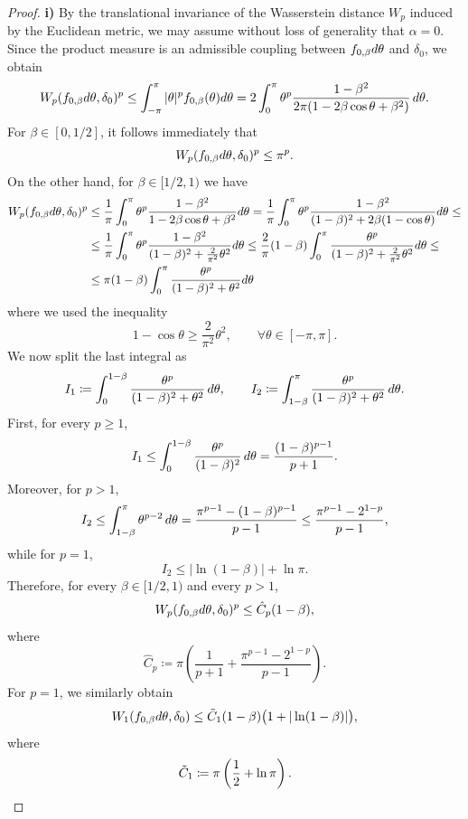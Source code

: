 \documentclass[10pt,a4paper]{amsart}
\renewcommand{\d}{\textnormal{d}}
\begin{document}
    \begin{proof} \textbf{i)} By the translational invariance of the Wasserstein distance $W_p$ induced by the Euclidean metric, we may assume without loss of generality that $\alpha=0$. Since the product measure is an admissible coupling between $f_{0,\beta}\d\theta$ and $\delta_0$, we obtain 
    $$W_p(f_{0,\beta}\d\theta,\delta_0)^p\leq\int_{-\pi}^\pi|\theta|^pf_{0,\beta}(\theta)\d\theta =2\int_0^\pi\theta^p\frac{1-\beta^2}{2\pi(1-2\beta\cos\theta+\beta^2)}\,\d\theta.$$
    For $\beta\in[0,1/2]$, it follows immediately that
    \begin{equation}\label{low_beta} W_p(f_{0,\beta}\d\theta,\delta_0)^p\leq\pi^p.
    \end{equation}
    On the other hand, for $\beta\in[1/2,1)$ we have
    \begin{align*}
            W_p(f_{0,\beta}\d\theta,\delta_0)^p&\leq\frac{1}{\pi}\int_0^\pi\theta^p\frac{1-\beta^2}{1-2\beta\cos\theta+\beta^2}\d\theta=\frac{1}{\pi}\int_0^\pi\theta^p\frac{1-\beta^2}{(1-\beta)^2+2\beta(1-\cos\theta)}\d\theta\leq\\
            &\leq\frac{1}{\pi}\int_0^\pi\theta^p\frac{1-\beta^2}{(1-\beta)^2+\frac{2}{\pi^2}\theta^2}\d\theta\leq\frac{2}{\pi}(1-\beta)\int_0^\pi\frac{\theta^p}{(1-\beta)^2+\frac{2}{\pi^2}\theta^2}\d\theta\leq\\
            &\leq\pi(1-\beta)\int_0^\pi\frac{\theta^p}{(1-\beta)^2+\theta^2}\d\theta
    \end{align*}
    where we used the inequality $$1-\cos\theta\geq\frac{2}{\pi^2}\theta^2,\qquad \forall\theta\in[-\pi,\pi].$$ We now split the last integral as 
    $$I_1\coloneqq\int_0^{1-\beta}\frac{\theta^p}{(1-\beta)^2+\theta^2}\,\d\theta, \qquad I_2\coloneqq\int_{1-\beta}^{\pi}\frac{\theta^p}{(1-\beta)^2+\theta^2}\,\d\theta.$$
    First, for every $p\geq1$,
    $$I_1\leq\int_0^{1-\beta}\frac{\theta^p}{(1-\beta)^2}\,\d\theta =\frac{(1-\beta)^{p-1}}{p+1}.$$
    Moreover, for $p>1$,
    $$I_2\leq\int_{1-\beta}^{\pi}\theta^{p-2}\,\d\theta =\frac{\pi^{p-1}-(1-\beta)^{p-1}}{p-1} \leq\frac{\pi^{p-1}-2^{1-p}}{p-1},$$
    while for $p=1$,
    $$I_2\leq|\ln(1-\beta)|+\ln\pi.$$
    Therefore, for every $\beta\in[1/2,1)$ and every $p>1$,
    $$W_p(f_{0,\beta}\d\theta,\delta_0)^p \leq\hat{C}_p(1-\beta),$$
    where
    $$\hat{C}_p\coloneqq \pi\left(\frac{1}{p+1} + \frac{\pi^{p-1}-2^{1-p}}{p-1}\right).$$
    For $p=1$, we similarly obtain
    $$W_1(f_{0,\beta}\d\theta,\delta_0) \leq \Tilde{C}_1(1-\beta)\bigl(1+|\ln(1-\beta)|\bigr),$$
    where $$\Tilde{C}_1\coloneqq \pi\left(\frac12+\ln\pi\right).$$

\end{proof}
\end{document}
